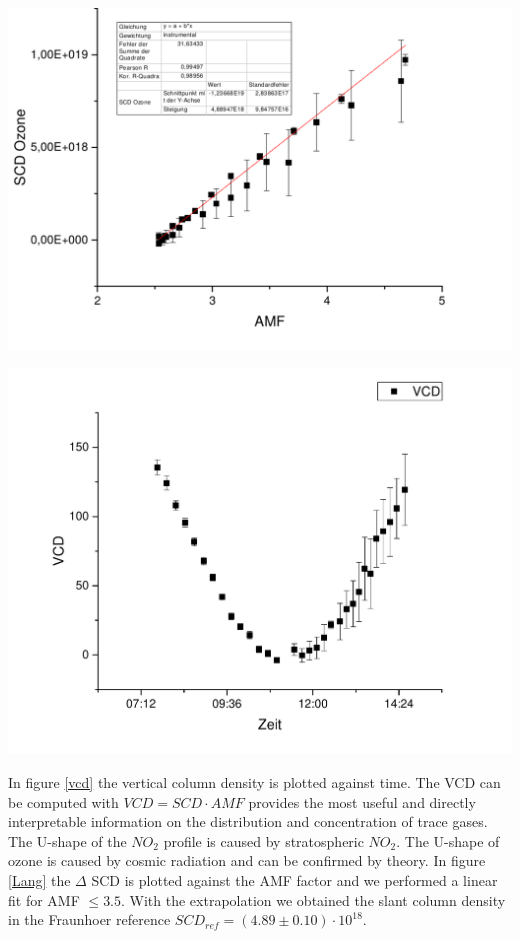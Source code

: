 \documentclass[12pt, english]{scrartcl} %
\newenvironment{Figure}
  {\par\medskip\noindent\minipage{\linewidth}}
  {\endminipage\par\medskip}
\begin{document}
\begin{multicols}{2}
\begin{Figure}
  \label{O2}
\end{Figure}
\begin{Figure}
 \centering
 \captionsetup{format=plain}
 \includegraphics[width=\linewidth]{graphics/o3langley.pdf}
  \label{Lang}
\end{Figure}
\begin{Figure}
 \centering
 \captionsetup{format=plain}
 \includegraphics[width=\linewidth]{graphics/03vcd.pdf}
  \label{vcd}
\end{Figure}
In figure \ref{vcd} the vertical column density is plotted against time. The VCD can be computed with $VCD = SCD \cdot AMF$ provides the most useful and directly interpretable information on the distribution and concentration of trace gases. The U-shape of the $NO_2$ profile is caused by stratospheric $NO_2$. The U-shape of ozone is caused by cosmic radiation and can be confirmed by theory. In figure \ref{Lang} the $\Delta$ SCD is plotted against the AMF factor and we performed a linear fit for AMF $\leq 3.5$. With the extrapolation we obtained the slant column density in the Fraunhoer reference $SCD_{ref} =( 4.89\pm 0.10 ) \cdot 10^{18} $.

\end{multicols}
\end{document}
